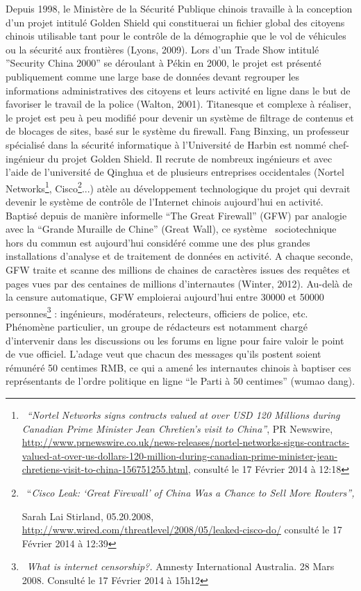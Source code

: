 {\color{black}
Depuis 1998, le Minist\`ere de la S\'ecurit\'e Publique chinois travaille \`a la conception d'un projet intitul\'e
Golden Shield qui constituerai un fichier global des citoyens chinois utilisable tant pour le contr\^ole de la
d\'emographie que le vol de v\'ehicules ou la s\'ecurit\'e aux fronti\`eres (Lyons, 2009). Lors d'un Trade Show
intitul\'e ''Security China 2000'' se d\'eroulant \`a P\'ekin en 2000, le projet est pr\'esent\'e publiquement comme
une large base de donn\'ees devant regrouper les informations administratives des citoyens et leurs activit\'e en ligne
dans le but de favoriser le travail de la police (Walton, 2001). Titanesque et complexe \`a r\'ealiser, le projet est
peu \`a peu modifi\'e pour devenir un syst\`eme de filtrage de contenus et de blocages de sites, bas\'e sur le
syst\`eme du firewall. Fang Binxing, un professeur sp\'ecialis\'e dans la s\'ecurit\'e informatique \`a l'Universit\'e
de Harbin est nomm\'e chef-ing\'enieur du projet Golden Shield. Il recrute de nombreux ing\'enieurs et avec l'aide de
l'universit\'e de Qinghua et de plusieurs entreprises occidentales (Nortel
Networks\footnote{\ \textit{{}``}\textit{Nortel Networks signs contracts valued at over USD 120 Millions during
Canadian Prime Minister Jean Chretien's visit to China''}, PR Newswire,
\url{http://www.prnewswire.co.uk/news-releases/nortel-networks-signs-contracts-valued-at-over-us-dollars-120-million-during-canadian-prime-minister-jean-chretiens-visit-to-china-156751255.html,}
consult\'e le 17 F\'evrier 2014 \`a 12:18}, Cisco\footnote{\ {}``\textit{Cisco Leak:
}\textrm{\textit{{}`}}\textit{Great Firewall}\textrm{\textit{{}'}}\textit{ of China Was a Chance to Sell More
Routers'', }\par Sarah Lai Stirland, 05.20.2008, \url{http://www.wired.com/threatlevel/2008/05/leaked-cisco-do/}
consult\'e le 17 F\'evrier 2014 \`a 12:39}...) at\`ele au d\'eveloppement technologique du projet qui devrait devenir
le syst\`eme de contr\^ole de l'Internet chinois aujourd'hui en activit\'e. Baptis\'e depuis de mani\`ere informelle
``The Great Firewall'' (GFW) par analogie avec la ``Grande Muraille de Chine'' (Great Wall), ce syst\`eme
{\guillemotleft}~sociotechnique~{\guillemotright} hors du commun est aujourd'hui consid\'er\'e comme une des plus
grandes installations d'analyse et de traitement de donn\'ees en activit\'e. A chaque seconde, GFW traite et scanne des
millions de chaines de caract\`eres issues des requ\^etes et pages vues par des centaines de millions d'internautes
(Winter, 2012). Au-del\`a de la censure automatique, GFW emploierai aujourd'hui entre 30000 et 50000
personnes\footnote{\ \textit{{\textquotedbl}What is internet censorship?{\textquotedbl}.} Amnesty International
Australia. 28 Mars 2008. Consult\'e le 17 F\'evrier 2014 \`a 15h12} : ing\'enieurs, mod\'erateurs, relecteurs,
officiers de police, etc. Ph\'enom\`ene particulier, un groupe de r\'edacteurs est notamment charg\'e d'intervenir dans
les discussions ou les forums en ligne pour faire valoir le point de vue officiel. L'adage veut que chacun des messages
qu'ils postent soient r\'emun\'er\'e 50 centimes RMB, ce qui a amen\'e les internautes chinois \`a baptiser ces
repr\'esentants de l'ordre politique en ligne ``le Parti \`a 50 centimes'' (wumao dang).}


